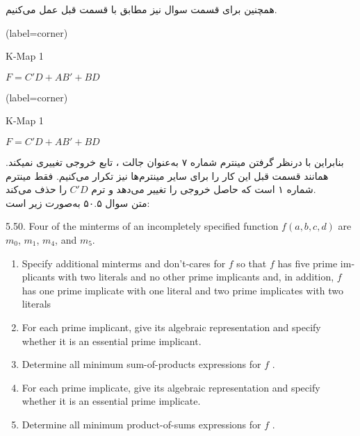 همچنین برای قسمت  سوال نیز مطابق با قسمت قبل عمل می‌کنیم. 

\begin{latin}
	\begin{minipage}{0.48\textwidth}
		\centering
		\begin{karnaugh-map}[4][4][1][$B$][$A$][$D$][$C$](label=corner)
		\end{karnaugh-map}
		\caption{K-Map 1}
		$F=C'D+AB'+BD$
	\end{minipage}
	\hfill
	\begin{minipage}{0.48\textwidth}
		\centering
		\begin{karnaugh-map}[4][4][1][$B$][$A$][$D$][$C$](label=corner)
		\end{karnaugh-map}
		\caption{K-Map 1}
		$F=C'D+AB'+BD$
	\end{minipage}	
\end{latin}
 
 بنابراین با درنظر گرفتن مینترم شماره ۷ به‌عنوان جالت ، تابع خروجی تغییری نمیکند. همانند قسمت قبل این کار را برای سایر مینترم‌ها نیز تکرار می‌کنیم. فقط مینترم شماره ۱ است که حاصل خروجی را تغییر می‌دهد و ترم $C'D$ را حذف می‌کند. \\





متن سوال ۵۰.۵ به‌صورت زیر است:

\begin{latin}
	5.50. Four of the minterms of an incompletely specified function $f(a, b, c, d)$ are $m_0$, $m_1$, $m_4$, and $m_5$.
	
	\begin{enumerate}
		\item 
		Specify additional minterms and don’t-cares for $f$ so that $f$ has five prime implicants with two literals and no other prime implicants and, in addition, $f$ has one prime implicate with one literal and two prime implicates with two literals
		
		\item 
		For each prime implicant, give its algebraic representation and specify whether
		it is an essential prime implicant.
		
		\item 
		Determine all minimum sum-of-products expressions for $f$ .
		
		\item 
		For each prime implicate, give its algebraic representation and specify whether
		it is an essential prime implicate.
		
		\item 
		Determine all minimum product-of-sums expressions for $f$ .
	\end{enumerate}
\end{latin}





